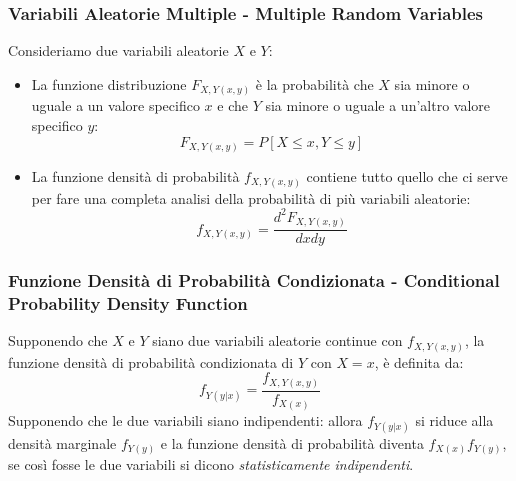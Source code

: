         \subsubsection{Variabili Aleatorie Multiple - Multiple Random Variables}
            Consideriamo due variabili aleatorie $X$ e $Y$:
            \begin{itemize}
                \item {
                    La funzione distribuzione $F_{X,Y (x,y)}$ è la probabilità che $X$ sia minore o uguale a un valore specifico $x$ e che $Y$
                    sia minore o uguale a un'altro valore specifico $y$:
                    \[
                        F_{X,Y (x,y)} = P[X\leq x,Y\leq y]    
                    \]
                }
                \item {
                    La funzione densità di probabilità $f_{X,Y (x,y)}$ contiene tutto quello che ci serve per fare una completa analisi della probabilità
                    di più variabili aleatorie:
                    \[
                        f_{X,Y (x,y)} = \frac{d^2 F_{X,Y (x,y)}}{dxdy}     
                    \]

                }
            \end{itemize}
        \subsubsection{Funzione Densità di Probabilità Condizionata - Conditional Probability Density Function}
            Supponendo che $X$ e $Y$ siano due variabili aleatorie continue con $f_{X,Y (x,y)}$, la funzione densità di probabilità condizionata di $Y$ con $X=x$,
            è definita da:
            \[
                f_{Y (y|x)} = \frac{f_{X,Y (x,y)}}{f_{X(x)}}     
            \]
            Supponendo che le due variabili siano indipendenti: allora $f_{Y (y|x)}$ si riduce alla densità marginale $f_{Y (y)}$ e la funzione densità di
            probabilità diventa $f_{X (x)}f_{Y (y)}$, se così fosse le due variabili si dicono \emph{statisticamente indipendenti}.
